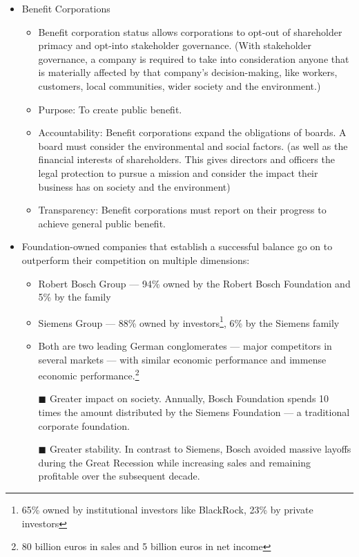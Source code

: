 \documentclass[oneside]{book}
\begin{document}
\begin{enumerate}
\begin{itemize}
\begin{itemize}
            \item Benefit Corporations
            \begin{itemize}
                \item Benefit corporation status allows corporations to opt-out of shareholder primacy and opt-into stakeholder governance. (With stakeholder governance, a company is required to take into consideration anyone that is materially affected by that company's decision-making, like workers, customers, local communities, wider society and the environment.)
                \item Purpose: To create public benefit. 
                \item Accountability: Benefit corporations expand the obligations of boards. A board must consider the environmental and social factors. (as well as the financial interests of shareholders. This gives directors and officers the legal protection to pursue a mission and consider the impact their business has on society and the environment)
                \item Transparency: Benefit corporations must report on their progress to achieve general public benefit.
            \end{itemize}
            \item Foundation-owned companies that establish a successful balance go on to outperform their competition on multiple dimensions: 
            \begin{itemize}
                \item Robert Bosch Group --- 94\% owned by the Robert Bosch Foundation and 5\% by the family
                \item Siemens Group --- 88\% owned by investors\footnote{65\% owned by institutional investors like BlackRock, 23\% by private investors}, 6\% by the Siemens family 
                \item Both are two leading German conglomerates --- major competitors in several markets --- with similar economic performance and immense economic performance.\footnote{80 billion euros in sales and 5 billion euros in net income}
                \item[\(\blacksquare\)] Greater impact on society. Annually, Bosch Foundation spends 10 times the amount distributed by the Siemens Foundation --- a traditional corporate foundation.
                \item[\(\blacksquare\)] Greater stability. In contrast to Siemens, Bosch avoided massive layoffs during the Great Recession while increasing sales and remaining profitable over the subsequent decade. 
            \end{itemize}
        \end{itemize}
    \end{itemize}
\end{enumerate}
\end{document}
